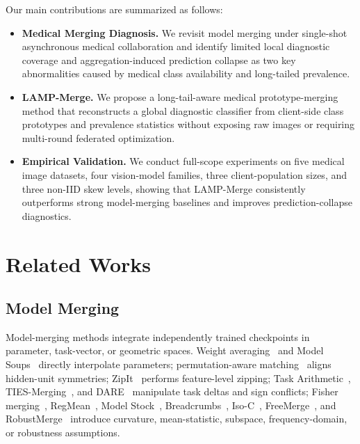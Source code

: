 \documentclass[letterpaper]{article} %
\begin{document}
Our main contributions are summarized as follows:
\begin{itemize}
    \item \textbf{Medical Merging Diagnosis.} We revisit model merging under single-shot asynchronous medical collaboration and identify limited local diagnostic coverage and aggregation-induced prediction collapse as two key abnormalities caused by medical class availability and long-tailed prevalence.
    \item \textbf{LAMP-Merge.} We propose a long-tail-aware medical prototype-merging method that reconstructs a global diagnostic classifier from client-side class prototypes and prevalence statistics without exposing raw images or requiring multi-round federated optimization.
    \item \textbf{Empirical Validation.} We conduct full-scope experiments on five medical image datasets, four vision-model families, three client-population sizes, and three non-IID skew levels, showing that LAMP-Merge consistently outperforms strong model-merging baselines and improves prediction-collapse diagnostics.
\end{itemize}

\section{Related Works}

\subsection{Model Merging}

Model-merging methods integrate independently trained checkpoints in parameter, task-vector, or geometric spaces. Weight averaging~\cite{izmailov2018averaging} and Model Soups~\cite{pmlr-v162-wortsman22a} directly interpolate parameters; permutation-aware matching~\cite{entezari2022role,ainsworth2023gitrebasinmergingmodels} aligns hidden-unit symmetries; ZipIt~\cite{stoica2024zipit} performs feature-level zipping; Task Arithmetic~\cite{ilharco2023editingmodelstaskarithmetic}, TIES-Merging~\cite{yadav2023tiesmergingresolvinginterferencemerging}, and DARE~\cite{yu2024languagemodelssupermario} manipulate task deltas and sign conflicts; Fisher merging~\cite{wu_parameter_2025}, RegMean~\cite{jin2025datalessknowledgefusionmerging}, Model Stock~\cite{jang2025modelstockneedjust}, Breadcrumbs~\cite{davari2024modelbreadcrumbsscalingmultitask}, Iso-C~\cite{marczak2025taskleftbehindisotropic}, FreeMerge~\cite{zheng2025freemergingfouriertransformefficient}, and RobustMerge~\cite{zeng2025robustmergeparameterefficientmodelmerging} introduce curvature, mean-statistic, subspace, frequency-domain, or robustness assumptions.
\end{document}
